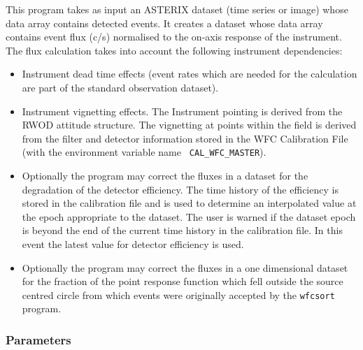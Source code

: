 This program takes as input an ASTERIX dataset (time series or image)
whose data array contains detected events. It creates
a dataset whose data array contains event flux (c/s) normalised
to the on-axis response of the instrument. The flux calculation takes
into account the following instrument dependencies:

\begin{itemize}

\item Instrument dead time effects (event rates which are needed for
the calculation are part of the standard observation dataset).

\item Instrument vignetting effects. The Instrument pointing is derived
from the RWOD attitude structure. The vignetting at points within the
field is derived from the filter and detector information stored in the
WFC Calibration File (with the environment variable name {\tt
CAL\_WFC\_MASTER}).

\item Optionally the program may correct the fluxes in a dataset for
the degradation of the detector efficiency. The time history of the
efficiency is stored in the calibration file and is used to determine
an interpolated value at the epoch appropriate to the dataset. The user
is warned if the dataset epoch is beyond the end of the current time
history in the calibration file. In this event the latest value for
detector efficiency is used.

\item Optionally the program may correct the fluxes in a one
dimensional dataset for the fraction of the point response function
which fell outside the source centred circle from which events were
originally accepted by the {\tt wfcsort} program.

\end{itemize}

\subsubsection{Parameters}

